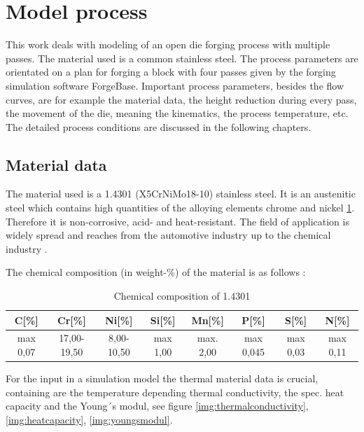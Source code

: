\section{Model process}
\label{sec:model_process}
This work deals with modeling of an open die forging process with multiple passes. The material used is a common stainless steel. The process parameters are orientated on a plan for forging a block with four passes given by the forging simulation software ForgeBase. Important process parameters, besides the flow curves, are for example the material data, the height reduction during every pass, the movement of the die, meaning the kinematics, the process temperature, etc. The detailed process conditions are discussed in the following chapters.\par

\subsection{Material data}
The material used is a 1.4301 (X5CrNiMo18-10) stainless steel. It is an austenitic steel which contains high quantities of the alloying elements chrome and nickel \ref{table:chemicalcomposition}. Therefore it is non-corrosive, acid- and heat-resistant. The field of application is widely spread and reaches from the automotive industry up to the chemical industry \cite{1.4301}.\par

The chemical composition (in weight-\%) of the material is as follows \cite{metallograf.de}:
\begin{table}[htbp]%
 \footnotesize
 \centering
 \caption{Chemical composition of 1.4301}
 \begin{tabular}{|c|c|c|c|c|c|c|c|}
 \hline
 C[\%]&Cr[\%]&Ni[\%]&Si[\%]&Mn[\%]&P[\%]&S[\%]&N[\%]\\\hline
 max 0,07&17,00-19,50&8,00-10,50&max 1,00&max. 2,00&max 0,045&max 0,03&max 0,11\\\hline
 \end{tabular}
 \label{table:chemicalcomposition}
\end{table}\par

For the input in a simulation model the thermal material data is crucial, containing are the temperature depending thermal conductivity, the spec. heat capacity and the Young´s modul, see figure \ref{img:thermalconductivity}, \ref{img:heatcapacity}, \ref{img:youngsmodul}. 


